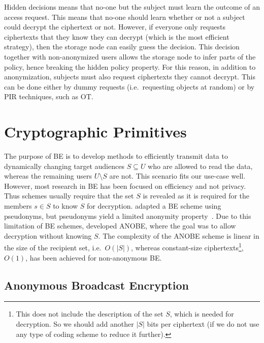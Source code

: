 Hidden decisions means that no-one but the subject must learn the outcome of an 
access request.
This means that no-one should learn whether or not a subject could decrypt the 
ciphertext or not.
However, if everyone only requests ciphertexts that they know they can decrypt 
(which is the most efficient strategy), then the storage node can easily guess 
the decision.
This decision together with non-anonymized users allows the storage node to 
infer parts of the policy, hence breaking the hidden policy property.
For this reason, in addition to anonymization, subjects must also request 
ciphertexts they cannot decrypt.
This can be done either by dummy requests (i.e.\ requesting objects at random) 
or by \ac{PIR} techniques, such as \ac{OT}.


\section<article>{Cryptographic Primitives}\label{BE}\label{Prerequisites}

The purpose of \ac{BE} is to develop methods to efficiently transmit data to 
dynamically changing target audiences \(S\subseteq U\) who are allowed to read 
the data, whereas the remaining users \(U\setminus S\) are not.
This scenario fits our use-case well.
However, most research in \ac{BE} has been focused on efficiency and not 
privacy.
Thus schemes usually require that the set \(S\) is revealed as it is required 
for the members \(s\in S\) to know \(S\) for decryption.
\citet{PseudonymousBE} adapted a \ac{BE} scheme using pseudonyms, but 
pseudonyms yield a limited anonymity property~\cite{PseudonymousBE}.
Due to this limitation of \ac{BE} schemes, \citet{ANOBE} developed \ac{ANOBE}, 
where the goal was to allow decryption without knowing \(S\).
The complexity of the \ac{ANOBE} scheme is linear in the size of the recipient 
set, i.e.~\(O(|S|)\), whereas constant-size ciphertexts\footnote{%
  This does not include the description of the set \(S\), which is needed for 
  decryption.
  So we should add another \(|S|\) bits per ciphertext (if we do not use any 
  type of coding scheme to reduce it further).
}, \(O(1)\), has been achieved for non-anonymous \ac{BE}.

\subsection{Anonymous Broadcast Encryption}\label{ANOBE}

